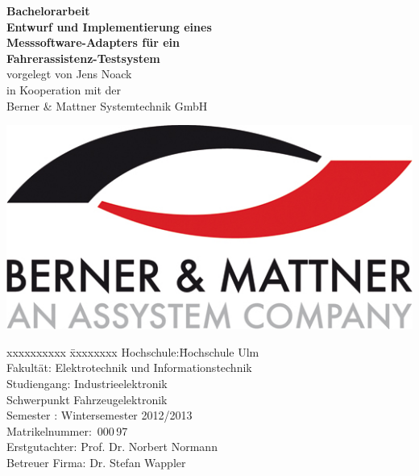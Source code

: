 \documentclass[12pt,a4paper]{report}
\begin{document}
\begin{titlepage}
\centering
\vfill
{\bfseries\Huge Bachelorarbeit}\\[2cm]
{\bfseries\Large Entwurf und Implementierung eines}\\[0.2cm]
{\bfseries\Large Messsoftware-Adapters für ein}\\[0.2cm]
{\bfseries\Large Fahrerassistenz-Testsystem}\\
\vfill
vorgelegt von
\vfill
{\large Jens Noack}\\
\vfill
in Kooperation mit der\\[0.3cm]
{\large Berner \& Mattner Systemtechnik GmbH}\\
\begin{center}
\includegraphics[scale  = 1]{Darstellungen/B_M_Logo2}
\end{center}
\vfill
\begin{center}\parbox{0cm}{\begin{tabbing}
xxxxxxxxxx \= xxxxxxxx \kill
Hochschule:\quad\quad\quad\quad\quad\quad\quad\quad\quad \= Hochschule Ulm \\
Fakultät: \> Elektrotechnik und Informationstechnik \\
Studiengang: \> Industrieelektronik \\
\> Schwerpunkt Fahrzeugelektronik \\
Semester : \> Wintersemester 2012/2013 \\
Matrikelnummer: \,000\,97 \\
Erstgutachter: \> Prof. Dr. Norbert Normann \\
Betreuer Firma: \> Dr. Stefan Wappler
\end{tabbing}}
\end{center}


\end{titlepage}
\end{document}
